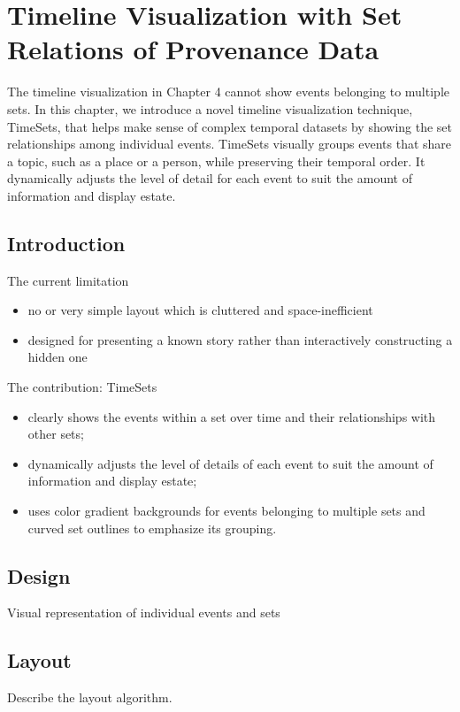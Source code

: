 \chapter{Timeline Visualization with Set Relations of Provenance Data}

\graphicspath{{Chapter4/figures/}}
The timeline visualization in Chapter 4 cannot show events belonging to multiple sets. In this chapter, we introduce a novel timeline visualization technique, TimeSets, that helps make sense of complex temporal datasets by showing the set relationships among individual events. TimeSets visually groups events that share a topic, such as a place or a person, while preserving their temporal order. It dynamically adjusts the level of detail for each event to suit the amount of information and display estate. 

\section{Introduction}
The current limitation
\begin{itemize}
	\item no or very simple layout which is cluttered and space-inefficient
	\item designed for presenting a known story rather than interactively constructing a hidden one
\end{itemize} 

The contribution: TimeSets
\begin{itemize}
	\item clearly shows the events within a set over time and their relationships with other sets; 
	\item dynamically adjusts the level of details of each event to suit the amount of information and display estate;
	\item uses color gradient backgrounds for events belonging to multiple sets and curved set outlines to emphasize its grouping.
\end{itemize}

\section{Design}
Visual representation of individual events and sets

\section{Layout}
Describe the layout algorithm.

